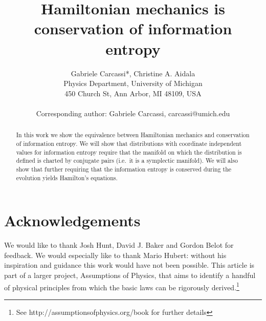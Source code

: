 \documentclass[11pt]{article}
\begin{document}
\title{Hamiltonian mechanics is conservation of information entropy}
\author{Gabriele Carcassi*, Christine A. Aidala \\ Physics Department, University of Michigan \\ 450 Church St, Ann Arbor, MI 48109, USA \\ \\
Corresponding author: Gabriele Carcassi, carcassi@umich.edu}
\maketitle

\begin{abstract}
	In this work we show the equivalence between Hamiltonian mechanics and conservation of information entropy. We will show that distributions with coordinate independent values for information entropy require that the manifold on which the distribution is defined is charted by conjugate pairs (i.e.~it is a symplectic manifold). We will also show that further requiring that the information entropy is conserved during the evolution yields Hamilton's equations.
\end{abstract}


\section*{Acknowledgements}

We would like to thank Josh Hunt, David J. Baker and Gordon Belot for feedback. We would especially like to thank Mario Hubert: without his inspiration and guidance this work would have not been possible. This article is part of a larger project, Assumptions of Physics, that aims to identify a handful of physical principles from which the basic laws can be rigorously derived.\footnote{See http://assumptionsofphysics.org/book for further details}
\end{document}
